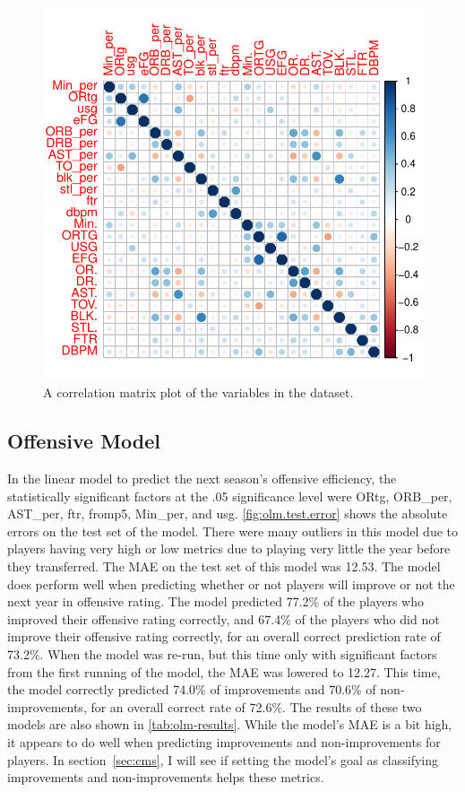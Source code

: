 \documentclass[12pt]{article}
\begin{document}
\begin{figure}[tbp]
	\centering
	\includegraphics[width=\textwidth]{corrplot}
	\caption{A correlation matrix plot of the variables in the dataset.}
	\label{fig:corrplot}
\end{figure}

\subsection{Offensive Model}
\label{subsec:olm}
In the linear model to predict the next season's offensive efficiency, the statistically significant factors at the .05 significance level were ORtg, ORB\_per, AST\_per, ftr, fromp5, Min_per, and usg. \autoref{fig:olm.test.error} shows the absolute errors on the test set of the model. There were many outliers in this model due to players having very high or low metrics due to playing very little the year before they transferred. The MAE on the test set of this model was 12.53. The model does perform well when predicting whether or not players will improve or not the next year in offensive rating. The model predicted 77.2\% of the players who improved their offensive rating correctly, and 67.4\% of the players who did not improve their offensive rating correctly, for an overall correct prediction rate of 73.2\%. When the model was re-run, but this time only with significant factors from the first running of the model, the MAE was lowered to 12.27. This time, the model correctly predicted 74.0\% of improvements and 70.6\% of non-improvements, for an overall correct rate of 72.6\%. The results of these two models are also shown in \autoref{tab:olm-results}. While the model's MAE is a bit high, it appears to do well when predicting improvements and non-improvements for players. In section~\ref{sec:cms}, I will see if setting the model's goal as classifying improvements and non-improvements helps these metrics.
\end{document}
